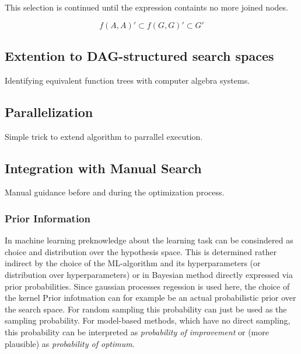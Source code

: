 \documentclass[english]{article}
\begin{document}
This selection is continued until the expression containts no more joined nodes.

$$ f(A,A)' \subset f(G,G)' \subset G' $$

\begin{algorithm}[H]
\SetAlgoLined

\end{algorithm}


\subsection{Extention to DAG-structured search spaces}
Identifying equivalent function trees with computer algebra systems.

\subsection{Parallelization}
Simple trick to extend algorithm to parrallel execution.

\subsection{Integration with Manual Search}
Manual guidance before and during the optimization process.

\subsubsection{Prior Information}
In machine learning preknowledge about the learning task can be consindered as choice and distribution over the hypothesis space. This is determined rather indirect by the choice of the \ac{ML}-algorithm and its hyperparameters (or distribution over hyperparameters) or in Bayesian method directly expressed via prior probabilities. Since gaussian processes regession is used here, the choice of the kernel
Prior infotmation can for example be an actual probabilistic prior over the search space. For random sampling this probability can just be used as the sampling probability. For model-based methods, which have no direct sampling, this probability can be interpreted as \textit{probability of improvement} or (more plausible) as \textit{probability of optimum}.
\end{document}
